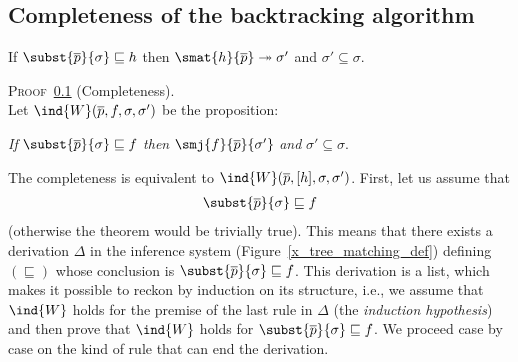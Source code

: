
\subsection{Completeness of the backtracking algorithm}
\label{backtracking:completeness_proof}

\begin{thm}[Completeness]\hfill
\begin{center}
If   \(\subst{\overline{p}}{\sigma} \sqsubseteq h\)
then \(\smat{h}{\overline{p}} \twoheadrightarrow \sigma'\) 
and  \(\sigma' \subseteq \sigma\).
\end{center}
\end{thm}

\noindent\textsc{Proof~\ref{backtracking:completeness_proof}}
(Completeness).\\
\noindent Let \(\ind{W}(\overline{p}, f, \sigma, \sigma')\) be the
proposition:
\begin{center}
\emph{If}   \(\subst{\overline{p}}{\sigma} \sqsubseteq f\)
\emph{then} \(\smj{f}{\overline{p}}{\sigma'}\)
\emph{and} \(\sigma' \subseteq \sigma\).
\end{center}
The completeness is equivalent to \(\ind{W}(\overline{p}, [h], \sigma,
\sigma')\). First, let us assume that
\begin{align}
  \subst{\overline{p}}{\sigma} \sqsubseteq f \label{x:compl:1}
\end{align}
(otherwise the theorem would be trivially true). This means that there
exists a derivation \(\Delta\) in the inference system
(Figure~\ref{x_tree_matching_def}) defining \((\sqsubseteq)\) whose
conclusion is \(\subst{\overline{p}}{\sigma} \sqsubseteq f\). This
derivation is a list, which makes it possible to reckon by induction
on its structure, i.e., we assume that \(\ind{W}\) holds for the
premise of the last rule in \(\Delta\) (the \emph{induction
hypothesis}) and then prove that \(\ind{W}\) holds for
\(\subst{\overline{p}}{\sigma} \sqsubseteq f\). We proceed case by
case on the kind of rule that can end the derivation.
